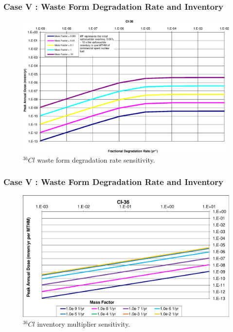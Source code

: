\begin{frame}[c]
  \frametitle{Case V : Waste Form Degradation Rate and Inventory}

\begin{figure}[ht!]
\centering
\includegraphics[width=\linewidth]{WFDegAndInv/Cl-36.eps}
\caption{$^{36}Cl$ waste form degradation rate sensitivity.}
\label{fig:WFDegCl36}
\end{figure}

\end{frame}

\begin{frame}[c]
  \frametitle{Case V : Waste Form Degradation Rate and Inventory}
\begin{figure}[ht!]
\centering
\includegraphics[width=\linewidth]{WFDegAndInv/Cl-36-MF.eps}
\caption{$^{36}Cl$ inventory multiplier sensitivity.}
\label{fig:WFDegCl36MF}
\end{figure}
\end{frame}

